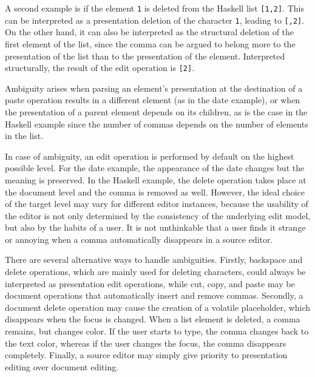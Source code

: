A second example is if the element \verb|1| is deleted from the Haskell list \verb|[1,2]|. This can be interpreted as a presentation deletion of the character \verb|1|, leading to \verb|[,2]|.  On the other hand, it can also be interpreted as the structural deletion of the first element of the list, since the comma can be argued to belong more to the presentation of the list than to the presentation of the element. Interpreted structurally, the result of the edit operation is \verb|[2]|. 

Ambiguity arises when parsing an element's presentation at the destination of a paste operation results in a different element (as in the date example), or when the presentation of a parent element depends on its children, as is the case in the Haskell example since the number of commas depends on the number of elements in the list. 


In case of ambiguity, an edit operation is performed by default on the highest possible level. For the date example, the appearance of the date changes but the meaning is preserved. In the Haskell example, the delete operation takes place at the document level and the comma is removed as well. However, the ideal choice of the target level may vary for different editor instances, because the usability of the editor is not only determined by the consistency of the underlying edit model, but also by the habits of a user. It is not unthinkable that a user finds it strange or annoying when a comma automatically disappears in a source editor. 

There are several alternative ways to handle ambiguities. Firstly, backspace and delete operations, which are mainly used for deleting characters, could always be interpreted as presentation edit operations, while cut, copy, and paste may be document operations that automatically insert and remove commas. Secondly, a document delete operation may cause the creation of a volatile placeholder, which disappears when the focus is changed. When a list element is deleted, a comma remains, but changes color. If the user starts to type, the comma changes back to the text color, whereas if the user changes the focus, the comma disappears completely. Finally, a source editor may simply give priority to presentation editing over document editing. 

